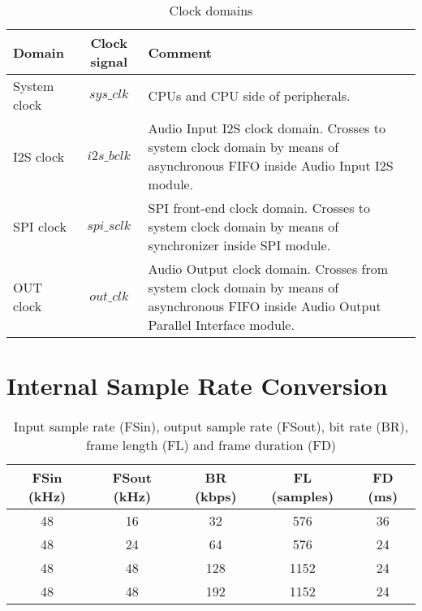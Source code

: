 \documentclass{rep}
\theoremstyle{plain}
\begin{document}
\begin{table}[H]
  \begin{center}
    \begin{tabular}{|l|c|p{10cm}|}
      \hline

      \rowcolor{iob-green}
      \textbf{Domain}  & \textbf{Clock signal} & \textbf{Comment}\\
      \hline
      \hline

      System clock & $sys\_clk$ & CPUs and CPU side of peripherals.\\ \hline

      \rowcolor{iob-blue} I2S clock & $i2s\_bclk$ & Audio Input I2S clock
      domain. Crosses to system clock domain by means of asynchronous FIFO
      inside Audio Input I2S module.\\ \hline

      SPI clock & $spi\_sclk$ & SPI front-end clock domain. Crosses to system
      clock domain by means of synchronizer inside SPI module.\\ \hline

      \rowcolor{iob-blue} OUT clock & $out\_clk$ & Audio Output clock
      domain. Crosses from system clock domain by means of asynchronous FIFO
      inside Audio Output Parallel Interface module.\\ \hline
      
    \end{tabular}
    \caption{Clock domains}
    \label{tab:cdc}
  \end{center}
\end{table}


\section{Internal Sample Rate Conversion}
\label{sec:src}

\begin{table}[H]
  \begin{center}
    \begin{tabular}{|c|c|c|c|c|}
      \hline

      \rowcolor{iob-green}
      \textbf{FSin (kHz)} & \textbf{FSout (kHz)} & \textbf{BR (kbps)}  & \textbf{FL (samples)} & \textbf{FD (ms)}\\
      \hline
      \hline

      48 & 16 & 32 & 576  & 36 \\ \hline

      \rowcolor{iob-blue} 
      48 & 24 & 64  & 576 & 24 \\ \hline

      48 & 48 & 128 & 1152 & 24 \\ \hline

      \rowcolor{iob-blue} 
      48 & 48 & 192 & 1152 & 24 \\\hline

    \end{tabular}
    \caption{Input sample rate (FSin), output sample rate (FSout), bit rate (BR), frame length (FL) and frame duration (FD)}
    \label{tab:src}
  \end{center}
\end{table}
\end{document}
